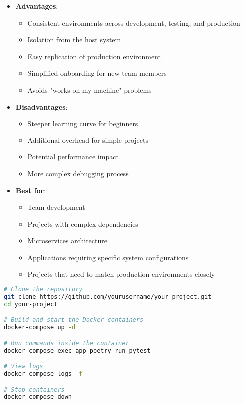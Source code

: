 \begin{itemize}
    \item \textbf{Advantages}:
    \begin{itemize}
        \item Consistent environments across development, testing, and production
        \item Isolation from the host system
        \item Easy replication of production environment
        \item Simplified onboarding for new team members
        \item Avoids "works on my machine" problems
    \end{itemize}
    
    \item \textbf{Disadvantages}:
    \begin{itemize}
        \item Steeper learning curve for beginners
        \item Additional overhead for simple projects
        \item Potential performance impact
        \item More complex debugging process
    \end{itemize}
    
    \item \textbf{Best for}:
    \begin{itemize}
        \item Team development
        \item Projects with complex dependencies
        \item Microservices architecture
        \item Applications requiring specific system configurations
        \item Projects that need to match production environments closely
    \end{itemize}
\end{itemize}

\begin{lstlisting}[language=bash, caption=Docker Development Setup]
# Clone the repository
git clone https://github.com/yourusername/your-project.git
cd your-project

# Build and start the Docker containers
docker-compose up -d

# Run commands inside the container
docker-compose exec app poetry run pytest

# View logs
docker-compose logs -f

# Stop containers
docker-compose down
\end{lstlisting}


